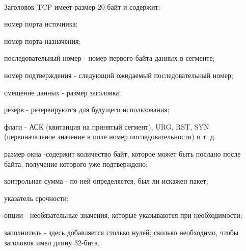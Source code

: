 \documentclass{article}
\begin{document}
~\

\begin{figure}[h]
\end{figure}

Заголовок TCP имеет размер 20 байт и содержит:
\begin{compactitem}
\item номер порта источника;
\item номер порта назначения;
\item последовательный номер - номер первого байта данных в сегменте;
\item номер подтверждения - следующий ожидаемый последовательный номер;
\item смещение данных - размер заголовка;
\item резерв - резервируются для будущего использования;
\item флаги - АСК (квитанция на принятый сегмент), URG, RST, SYN (первоначальное значение в поле номер последовательности) и т. д.
\item размер окна -содержит количество байт, которое может быть послано после байта, получение которого уже подтверждено;
\item контрольная сумма - по ней определяется, был ли искажен пакет;
\item указатель срочности;
\item опции - необязательные значения, которые указываются при необходимости;
\item заполнитель - здесь добавляется столько нулей, сколько необходимо, чтобы заголовок имел длину 32-бита.
\end{compactitem}
\end{document}
